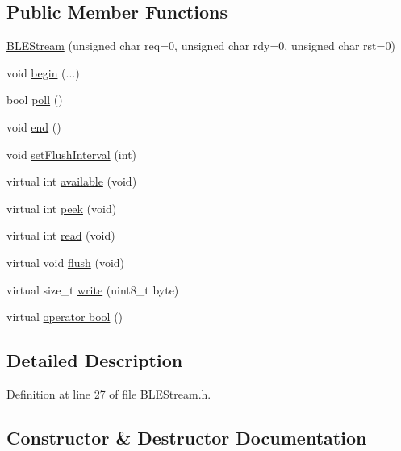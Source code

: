 \subsection*{Public Member Functions}
\begin{DoxyCompactItemize}
\item 
\hyperlink{class_b_l_e_stream_aa12f9098b653a30c2a152f647ab8bdfa}{B\+L\+E\+Stream} (unsigned char req=0, unsigned char rdy=0, unsigned char rst=0)
\item 
void \hyperlink{class_b_l_e_stream_a7cef0d2f7dc431608483c3911e68bb56}{begin} (...)
\item 
bool \hyperlink{class_b_l_e_stream_a58d4d0684a7c9f5434736af31ea2ab98}{poll} ()
\item 
void \hyperlink{class_b_l_e_stream_a2f571566304b41339d8a74cee6f98d2d}{end} ()
\item 
void \hyperlink{class_b_l_e_stream_ab05a77032b59c6d3525390e7e6a768ab}{set\+Flush\+Interval} (int)
\item 
virtual int \hyperlink{class_b_l_e_stream_a9b8dd79faf553535df6b68a8d572c8e2}{available} (void)
\item 
virtual int \hyperlink{class_b_l_e_stream_a932edda09fadf9530e2b87bed4d88bed}{peek} (void)
\item 
virtual int \hyperlink{class_b_l_e_stream_a607238a23059d0dbe133c3358e7c42ca}{read} (void)
\item 
virtual void \hyperlink{class_b_l_e_stream_af22a00b80511025785543d107422874a}{flush} (void)
\item 
virtual size\+\_\+t \hyperlink{class_b_l_e_stream_ad3e299ba3ad439d077f1b7bb74617698}{write} (uint8\+\_\+t byte)
\item 
virtual \hyperlink{class_b_l_e_stream_aded76dc2283104566c13fed9755e21f5}{operator bool} ()
\end{DoxyCompactItemize}


\subsection{Detailed Description}


Definition at line 27 of file B\+L\+E\+Stream.\+h.



\subsection{Constructor \& Destructor Documentation}
